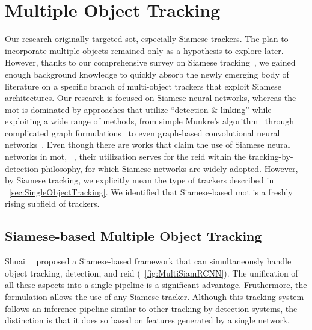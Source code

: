\section{Multiple Object Tracking}
\label{sec:MultipleObjectTracking}

Our research originally targeted \gls{sot}, especially Siamese trackers. The plan to incorporate multiple objects remained only as a hypothesis to explore later. However, thanks to our comprehensive survey on Siamese tracking~\cite{ondrasovic2021siamese}, we gained enough background knowledge to quickly absorb the newly emerging body of literature on a specific branch of multi-object trackers that exploit Siamese architectures. Our research is focused on Siamese neural networks, whereas the \gls{mot} is dominated by approaches that utilize ``detection \& linking'' while exploiting a wide range of methods, from simple Munkre's algorithm~\cite{munkres1957assignment} through complicated graph formulations~\cite{chen2001motdynamicgraph} to even graph-based convolutional neural networks~\cite{papakis2021gcnnmatch}. Even though there are works that claim the use of Siamese neural networks in \gls{mot}, \egtext{}~\cite{cuan2018deepsiammot}, their utilization serves for the \gls{reid} within the tracking-by-detection philosophy, for which Siamese networks are widely adopted. However, by Siamese tracking, we explicitly mean the type of trackers described in \sectiontext{}~\ref{sec:SingleObjectTracking}. We identified that Siamese-based \gls{mot} is a freshly rising subfield of trackers.

\subsection{Siamese-based Multiple Object Tracking}
\label{ssec:SiameseBasedMultipleObjectTracking}

Shuai~\etal{}~\cite{shuai2020multisiamrcnn} proposed a Siamese-based framework that can simultaneously handle object tracking, detection, and \gls{reid} (\figtext{}~\ref{fig:MultiSiamRCNN}). The unification of all these aspects into a single pipeline is a significant advantage. Fruthermore, the formulation allows the use of any Siamese tracker. Although this tracking system follows an inference pipeline similar to other tracking-by-detection systems, the distinction is that it does so based on features generated by a single network.

